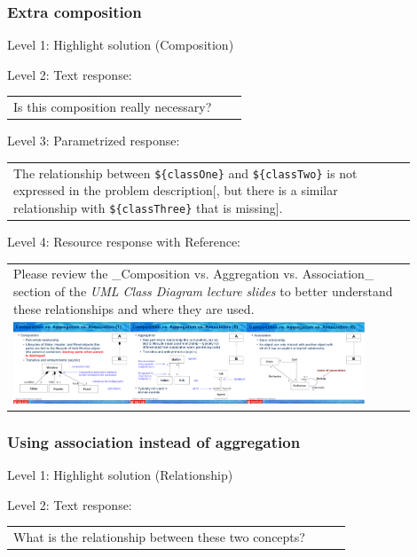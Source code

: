 \subsubsection{Extra composition}

\noindent Level 1: Highlight solution (Composition) \medskip

\noindent Level 2: Text response: \medskip

\begin{tabular}{|p{0.9\linewidth}}
Is this composition really necessary?
\end{tabular} \medskip

\noindent Level 3: Parametrized response: \medskip

\begin{tabular}{|p{0.9\linewidth}}
The relationship between \verb|${classOne}| and \verb|${classTwo}| is not expressed in the problem description[, but there is a similar relationship with \verb|${classThree}| that is missing].
\end{tabular} \medskip

\noindent Level 4: Resource response with Reference: \medskip

\begin{tabular}{|p{0.9\linewidth}}
Please review the _Composition vs. Aggregation vs. Association_ section of 
the \textit{UML Class Diagram lecture slides} to 
better understand these relationships and where they are used.

\\
\includegraphics[width=0.9\textwidth]{images/composition_aggregation_association.png}
\end{tabular} \medskip


\subsubsection{Using association instead of aggregation}

\noindent Level 1: Highlight solution (Relationship) \medskip

\noindent Level 2: Text response: \medskip

\begin{tabular}{|p{0.9\linewidth}}
What is the relationship between these two concepts?
\end{tabular} \medskip

